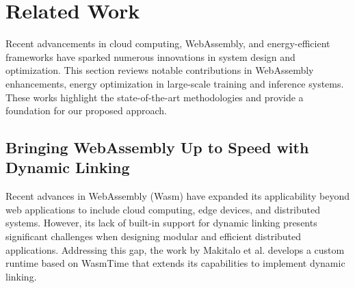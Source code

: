 \section{Related Work}

Recent advancements in cloud computing, WebAssembly, and energy-efficient frameworks have sparked numerous innovations in system design and optimization. This section reviews notable contributions in WebAssembly enhancements, energy optimization in large-scale training and inference systems. These works highlight the state-of-the-art methodologies and provide a foundation for our proposed approach.





\subsection{Bringing WebAssembly Up to Speed with Dynamic Linking}
\label{sec-3.1}

Recent advances in WebAssembly (Wasm) have expanded its applicability beyond web applications to include cloud computing, edge devices, and distributed systems. However, its lack of built-in support for dynamic linking presents significant challenges when designing modular and efficient distributed applications. Addressing this gap, the work by Makitalo et al. \cite{makitalo2021bringing} develops a custom runtime based on WasmTime that extends its capabilities to implement dynamic linking.

